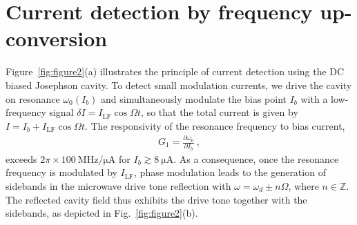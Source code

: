 \section{Current detection by frequency up-conversion}
% 
Figure~\ref{fig:figure2}(a) illustrates the principle of current detection using the DC biased Josephson cavity.
% 
To detect small modulation currents, we drive the cavity on resonance $\omega_0(I_b)$ and simultaneously modulate the bias point $I_b$ with a low-frequency signal $\delta I=I_\text{LF}\cos{\Omega t}$, so that the total current is given by $I=I_b+I_\text{LF}\cos\Omega t$.
% 
The responsivity of the resonance frequency to bias current,
\begin{align}
G_1 = \frac{\partial\omega_0}{\partial I_b} \ ,
\end{align}
exceeds $2\pi\times\SI{100}{\mega\hertz\per\micro\ampere}$ for $I_b\gtrsim\SI{8}{\micro\ampere}$.
% 
As a consequence, once the resonance frequency is modulated by $I_\text{LF}$, phase modulation leads to the generation of sidebands in the microwave drive tone reflection with $\omega = \omega_d \pm n \Omega$, where $n \in \mathbb{Z}$.
% 
The reflected cavity field thus exhibits the drive tone together with the sidebands, as depicted in Fig.~\ref{fig:figure2}(b).

